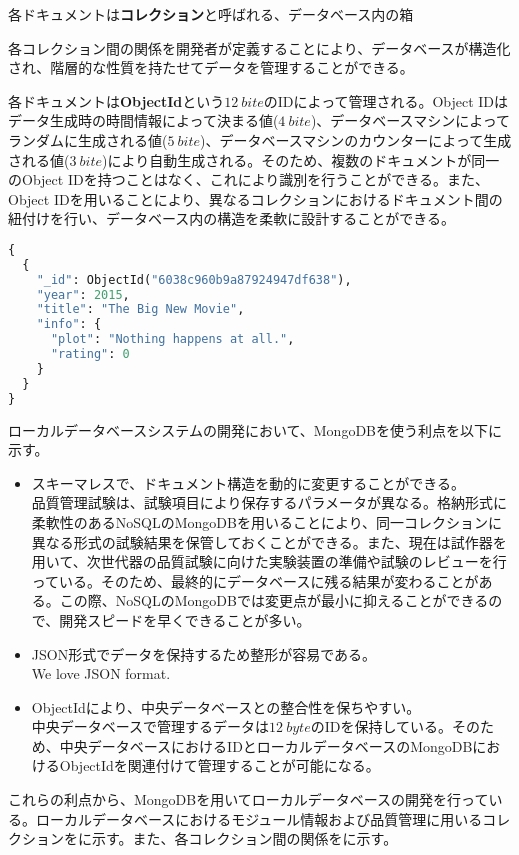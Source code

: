 各ドキュメントは\textbf{コレクション}と呼ばれる、データベース内の箱

各コレクション間の関係を開発者が定義することにより、データベースが構造化され、階層的な性質を持たせてデータを管理することができる。


各ドキュメントは\textbf{ObjectId}という$12\ \si{bite}$のIDによって管理される。Object IDはデータ生成時の時間情報によって決まる値($4\ \si{bite}$)、データベースマシンによってランダムに生成される値($5\ \si{bite}$)、データベースマシンのカウンターによって生成される値($3\ \si{bite}$)により自動生成される。そのため、複数のドキュメントが同一のObject IDを持つことはなく、これにより識別を行うことができる。また、Object IDを用いることにより、異なるコレクションにおけるドキュメント間の紐付けを行い、データベース内の構造を柔軟に設計することができる。

\begin{lstlisting}[caption=MongoDBのドキュメントの例,label=fuga, language=Python]
{
  {
    "_id": ObjectId("6038c960b9a87924947df638"),
    "year": 2015,
    "title": "The Big New Movie",
    "info": {
      "plot": "Nothing happens at all.",
      "rating": 0
    }
  }
}
\end{lstlisting}


ローカルデータベースシステムの開発において、MongoDBを使う利点を以下に示す。
\begin{itemize}
  \item スキーマレスで、ドキュメント構造を動的に変更することができる。 \\
  品質管理試験は、試験項目により保存するパラメータが異なる。格納形式に柔軟性のあるNoSQLのMongoDBを用いることにより、同一コレクションに異なる形式の試験結果を保管しておくことができる。また、現在は試作器を用いて、次世代器の品質試験に向けた実験装置の準備や試験のレビューを行っている。そのため、最終的にデータベースに残る結果が変わることがある。この際、NoSQLのMongoDBでは変更点が最小に抑えることができるので、開発スピードを早くできることが多い。
  \item JSON形式でデータを保持するため整形が容易である。\\
  We love JSON format.
  \item ObjectIdにより、中央データベースとの整合性を保ちやすい。 \\
  中央データベースで管理するデータは$12\ \si{byte}$のIDを保持している。そのため、中央データベースにおけるIDとローカルデータベースのMongoDBにおけるObjectIdを関連付けて管理することが可能になる。
\end{itemize}

これらの利点から、MongoDBを用いてローカルデータベースの開発を行っている。ローカルデータベースにおけるモジュール情報および品質管理に用いるコレクションをに示す。また、各コレクション間の関係をに示す。

